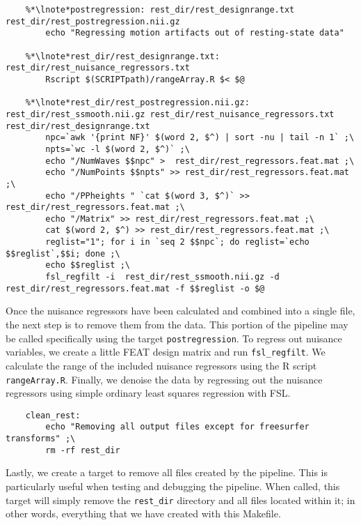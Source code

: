 \begin{lstlisting}
	%*\lnote*postregression: rest_dir/rest_designrange.txt rest_dir/rest_postregression.nii.gz
		echo "Regressing motion artifacts out of resting-state data"

	%*\lnote*rest_dir/rest_designrange.txt: rest_dir/rest_nuisance_regressors.txt
		Rscript $(SCRIPTpath)/rangeArray.R $< $@

	%*\lnote*rest_dir/rest_postregression.nii.gz: rest_dir/rest_ssmooth.nii.gz rest_dir/rest_nuisance_regressors.txt rest_dir/rest_designrange.txt
		npc=`awk '{print NF}' $(word 2, $^) | sort -nu | tail -n 1` ;\
		npts=`wc -l $(word 2, $^)` ;\
		echo "/NumWaves $$npc" >  rest_dir/rest_regressors.feat.mat ;\
		echo "/NumPoints $$npts" >> rest_dir/rest_regressors.feat.mat ;\
		echo "/PPheights " `cat $(word 3, $^)` >> rest_dir/rest_regressors.feat.mat ;\
		echo "/Matrix" >> rest_dir/rest_regressors.feat.mat ;\
		cat $(word 2, $^) >> rest_dir/rest_regressors.feat.mat ;\
		reglist="1"; for i in `seq 2 $$npc`; do reglist=`echo $$reglist`,$$i; done ;\
		echo $$reglist ;\
		fsl_regfilt -i  rest_dir/rest_ssmooth.nii.gz -d rest_dir/rest_regressors.feat.mat -f $$reglist -o $@
\end{lstlisting}

Once the nuisance regressors have been calculated and combined into a single file, the next step is to remove them from the data.  This portion of the pipeline may be called specifically using the target \texttt{postregression}.  To regress out nuisance variables, we create a little FEAT design matrix and run \texttt{fsl_regfilt}. We calculate the range of the included nuisance regressors using the R script \texttt{rangeArray.R}.  Finally, we denoise the data by regressing out the nuisance regressors using simple ordinary least squares regression with FSL.

\begin{lstlisting}
	clean_rest:
		echo "Removing all output files except for freesurfer transforms" ;\
		rm -rf rest_dir
\end{lstlisting}

Lastly, we create a target to remove all files created by the pipeline. This is particularly useful when testing and debugging the pipeline. When called, this target will simply remove the \texttt{rest_dir} directory and all files located within it; in other words, everything that we have created with this Makefile.


